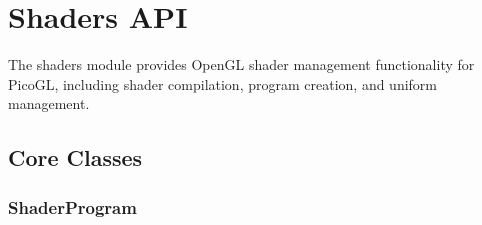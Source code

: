 \documentclass[a4paper,10pt,english,openany,oneside]{sphinxmanual}
\begin{document}
\sphinxstepscope


\section{Shaders API}
\label{\detokenize{api/shaders:shaders-api}}\label{\detokenize{api/shaders::doc}}
\sphinxAtStartPar
The shaders module provides OpenGL shader management functionality for PicoGL, including shader compilation, program creation, and uniform management.


\subsection{Core Classes}
\label{\detokenize{api/shaders:core-classes}}

\subsubsection{ShaderProgram}
\label{\detokenize{api/shaders:shaderprogram}}
\end{document}
